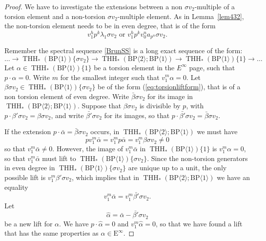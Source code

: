 \documentclass[11pt]{amsart}
\newcommand{\mr}[1]{\mathrm{#1}}
\newcommand{\BP}{\mr{BP}}
\DeclareMathOperator{\THH}{THH}
\theoremstyle{definition}
\numberwithin{equation}{section}
\numberwithin{figure}{section}
\begin{document}
\begin{proof}
  We have to investigate the extensions between a non $\sigma v_2$-multiple of  a torsion element and a non-torsion $\sigma v_2$-multiple element. As in Lemma~\ref{lem432}, the non-torsion element needs to be in even degree, that is of the form
  \begin{equation} \label{eq:torsionliftform}
    v_1^h p^k \lambda_1 \sigma v_2 \text{ or } v_1^h p^k v_0^n a_{p^n} \sigma v_2.
  \end{equation}

  Remember the spectral sequence \eqref{BrunSS} is a long exact sequence of the form:
  \[
    \dots \rightarrow \THH_*(\BP \langle 1 \rangle)\{ \sigma v_2\} \rightarrow \THH_*(\BP \langle 2 \rangle ; \BP \langle 1 \rangle) \rightarrow \THH_*(\BP \langle 1 \rangle)\{1\} \rightarrow \dots
  \]
  Let $\alpha \in \THH_*(\BP \langle 1 \rangle)\{1\}$ be a torsion element in the $E^\infty$ page, such that $p \cdot \alpha = 0$. Write $m$ for the smallest integer such that $v_1^m \alpha = 0$. Let $\beta \sigma v_2 \in \THH_*(\BP \langle 1 \rangle)\{ \sigma v_2\}$ be of the form (\ref{eq:torsionliftform}), that is of a non torsion element of even degree. Write $\bar{\beta} \sigma v_2$ for its image in $\THH_*(\BP \langle 2 \rangle ; \BP \langle 1 \rangle)$. Suppose that $\beta \sigma v_2$ is divisible by $p$, with $p \cdot \beta' \sigma v_2 = \beta \sigma v_2$, and write $\bar{\beta'} \sigma v_2$ for its images, so that $p \cdot \bar{\beta'} \sigma v_2 = \bar{\beta} \sigma v_2$.

  If the extension $p \cdot \bar{\alpha} = \bar{\beta} \sigma v_2$ occurs, in $\THH_*(\BP \langle 2 \rangle ; \BP \langle 1 \rangle)$ we must have
  \[
    p v_1^m \bar{\alpha} = v_1^m p \bar{\alpha} = v_1^m \beta \sigma v_2 \neq 0
  \]
  so that $v_1^m \bar{\alpha} \neq 0$. However, the image of $v_1^m \bar{\alpha}$ in $\THH_*(\BP \langle 1 \rangle)\{1\}$ is $v_1^m \alpha = 0$, so that $v_1^m \bar{\alpha}$ must lift to $\THH_*(\BP \langle 1 \rangle)\{ \sigma v_2\}$. Since the non-torsion generators in even degree in $\THH_*(\BP \langle 1 \rangle)\{ \sigma v_2\}$ are unique up to a unit, the only possible lift is $v_1^m \beta' \sigma v_2$, which implies that in $\THH_*(\BP \langle 2 \rangle ; \BP \langle 1 \rangle)$ we have an equality
  \[
    v_1^m \bar{\alpha} = v_1^m \bar{\beta'} \sigma v_2.
  \]
  Let
  \[
    \hat{\alpha} = \bar{\alpha} - \bar{\beta'} \sigma v_2
  \]
  be a new lift for $\alpha$. We have $p \cdot \hat{\alpha} = 0$ and $v_1^m \hat{\alpha} = 0$, so that we have found a lift that has the same properties as $\alpha \in \mathrm{E}^\infty$.


\end{proof}
\end{document}
